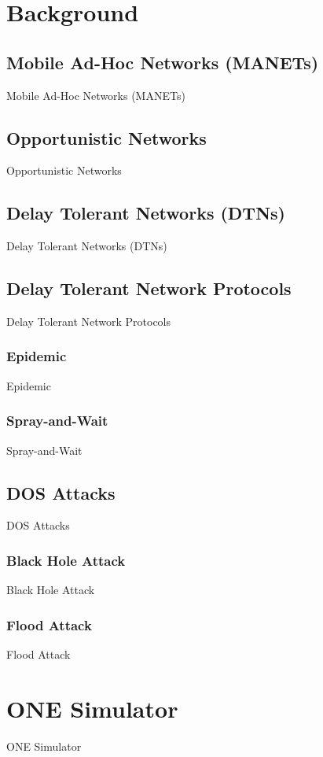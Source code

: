 \documentclass{article}
\begin{document}
\section{Background}

\subsection{Mobile Ad-Hoc Networks (MANETs)}
Mobile Ad-Hoc Networks (MANETs)

\subsection{Opportunistic Networks}
Opportunistic Networks

\subsection{Delay Tolerant Networks (DTNs)}
Delay Tolerant Networks (DTNs)

\subsection{Delay Tolerant Network Protocols}
Delay Tolerant Network Protocols

\subsubsection{Epidemic}
Epidemic

\subsubsection{Spray-and-Wait}
Spray-and-Wait

\subsection{DOS Attacks}
DOS Attacks

\subsubsection{Black Hole Attack}
Black Hole Attack

\subsubsection{Flood Attack}
Flood Attack

\section{ONE Simulator}
ONE Simulator
\end{document}
